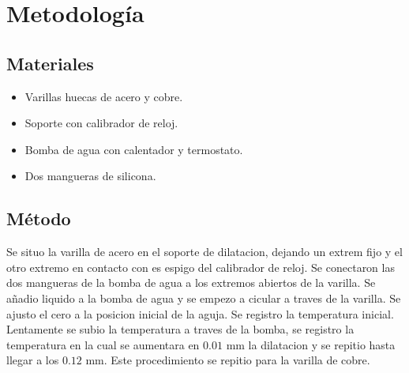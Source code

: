 \section*{Metodolog\'ia}
\subsection*{Materiales}
\begin{itemize}
    \item Varillas huecas de acero y cobre.
    \item Soporte con calibrador de reloj.
    \item Bomba de agua con calentador y termostato.
    \item Dos mangueras de silicona.
\end{itemize}
\subsection*{M\'etodo}
Se situo la varilla de acero en el soporte de dilatacion, dejando un extrem fijo y el otro extremo en contacto con es espigo del calibrador de reloj. Se conectaron las dos mangueras de la bomba de agua a los extremos abiertos de la varilla. Se a\~nadio liquido a la bomba de agua y se empezo a cicular a traves de la varilla. Se ajusto el cero a la posicion inicial de la aguja. Se registro la temperatura inicial. Lentamente se subio la temperatura a traves de la bomba, se registro la temperatura en la cual se aumentara en $0.01$ mm la dilatacion y se repitio hasta llegar a los $0.12$ mm. Este procedimiento se repitio para la varilla de cobre.
